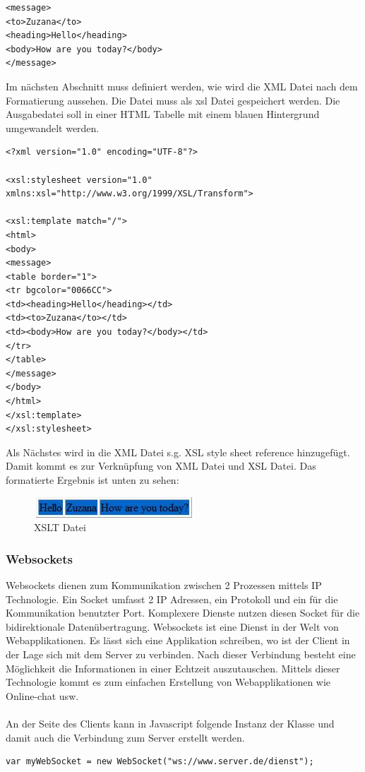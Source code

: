 \begin{lstlisting}
<message>
<to>Zuzana</to>
<heading>Hello</heading>
<body>How are you today?</body>
</message>
\end{lstlisting}

Im nächsten Abschnitt muss definiert werden, wie wird die XML Datei nach dem Formatierung aussehen. Die Datei muss als xsl Datei gespeichert werden. Die Ausgabedatei soll in einer HTML Tabelle mit einem blauen Hintergrund umgewandelt werden.

\begin{lstlisting}
<?xml version="1.0" encoding="UTF-8"?>

<xsl:stylesheet version="1.0"
xmlns:xsl="http://www.w3.org/1999/XSL/Transform">

<xsl:template match="/">
<html>
<body>
<message>
<table border="1">
<tr bgcolor="0066CC">
<td><heading>Hello</heading></td>
<td><to>Zuzana</to></td>
<td><body>How are you today?</body></td>
</tr> 
</table>
</message> 
</body>
</html> 
</xsl:template>
</xsl:stylesheet>  
\end{lstlisting}
Als Nächstes wird in die XML Datei s.g. XSL style sheet reference hinzugefügt. Damit kommt es zur Verknüpfung von XML Datei und XSL Datei. Das formatierte Ergebnis ist unten zu sehen:
\begin{figure}[h]
	\begin{center}
		\includegraphics[scale=0.7]{images/xslt.jpg} 
		\caption{XSLT Datei}
		\label{fig:XSLTDatei}
	\end{center}
\end{figure}
    
\subsubsection{Websockets}
\label{subsec:Websockets}
Websockets \cite{websocketsweb} dienen zum Kommunikation zwischen 2 Prozessen mittels IP Technologie. Ein Socket umfasst 2 IP Adressen, ein Protokoll und ein für die Kommunikation benutzter Port. Komplexere Dienste nutzen diesen Socket für die bidirektionale Datenübertragung. Websockets ist eine Dienst in der Welt von Webapplikationen. Es lässt sich eine Applikation schreiben, wo ist der Client in der Lage sich mit dem Server zu verbinden. Nach dieser Verbindung besteht eine Möglichkeit die Informationen in einer Echtzeit auszutauschen. Mittels dieser Technologie kommt es zum einfachen Erstellung von Webapplikationen wie Online-chat usw.
\\
\\
An der Seite des Clients kann in Javascript folgende Instanz der Klasse und damit auch die Verbindung zum Server erstellt werden.  
\begin{lstlisting}
var myWebSocket = new WebSocket("ws://www.server.de/dienst");
\end{lstlisting}

